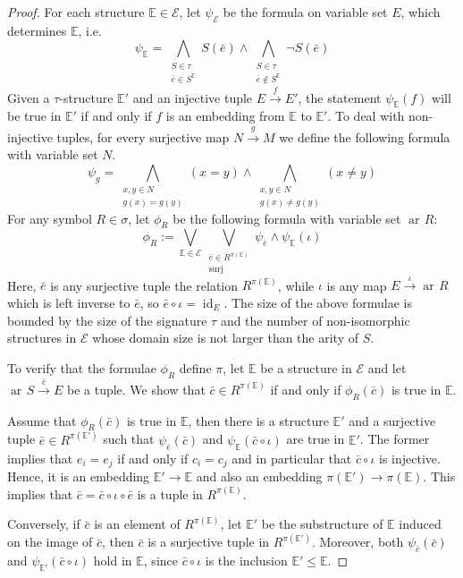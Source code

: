 \documentclass[preprint,12pt]{elsarticle}
\newcommand{\cat}[1]{\mathcal{#1}}
\newcommand{\str}[1]{\mathbb{#1}}
\DeclareMathOperator{\id}{id}
\DeclareMathOperator{\ar}{ar\!}
\begin{document}
\begin{proof}
    For each structure $\str E\in\cat E$, let $\psi_{\cat E}$ be the formula on variable set $E$, which determines $\str E$, i.e.
    $$
    \psi_{\str E} = 
    \bigwedge_{\substack{S\in\tau\\ \bar{e}\in S^{\str E}}} S(\bar{e}) \wedge
    \bigwedge_{\substack{S\in\tau\\ \bar{e}\notin S^{\str E}}} \neg S(\bar{e})
    $$
    Given a $\tau$-structure $\str E'$ and an injective tuple $E\xrightarrow{f}E'$, the statement $\psi_{\str E}(f)$ will be true in $\str E'$ if and only if $f$ is an embedding from $\str E$ to $\str E'$. To deal with non-injective tuples, for every surjective map $N\xrightarrow{g}M$ we define the following formula with variable set $N$.
    $$
    \psi_g =
    \bigwedge_{\substack{x,y\in N\\ g(x)= g(y)}} (x = y) \wedge
    \bigwedge_{\substack{x,y\in N\\ g(x)\neq g(y)}} (x \neq y)
    $$
    For any symbol $R\in\sigma$, let $\phi_R$ be the following formula with variable set $\ar R$:
    $$
    \phi_R :=
    \bigvee_{\str E\in\cat E}
    \bigvee_{\substack{\bar{e}\in R^{\pi(\str E)} \\ \text{surj}}}
    \psi_{\bar{e}}\wedge \psi_{\str E}(\iota)
    $$
    Here, $\bar{e}$ is any surjective tuple the relation $R^{\pi(\str E)}$, while $\iota$ is any map $E\xrightarrow{\iota}\ar R$ which is left inverse to $\bar{e}$, so $\bar{e}\circ\iota=\id_{E}$. The size of the above formulae is bounded by the size of the signature $\tau$ and the number of non-isomorphic structures in $\cat E$ whose domain size is not larger than the arity of $S$.
    
    To verify that the formulae $\phi_R$ define $\pi$, let $\str E$ be a structure in $\cat E$ and let $\ar S\xrightarrow{\bar{c}} E$ be a tuple. We show that $\bar{c}\in R^{\pi(\str E)}$ if and only if $\phi_R(\bar{c})$ is true in $\str E$.
    
    Assume that $\phi_R(\bar{c})$ is true in $\str E$, then there is a structure $\str E'$ and a surjective tuple $\bar{e}\in R^{\pi(\str E')}$ such that $\psi_{\bar{e}}(\bar{c})$ and $\psi_{\str E}({\bar{c}\circ\iota})$ are true in $\str E'$. The former implies that $e_i=e_j$ if and only if $c_i=c_j$ and in particular that $\bar{c}\circ\iota$ is injective. Hence, it is an embedding $\str E'\xrightarrow{}\str E$ and also an embedding $\pi(\str E')\xrightarrow{}\pi(\str E)$. This implies that $\bar{c}=\bar{c}\circ\iota\circ\bar{e}$ is a tuple in $R^{\pi(\str E)}$.

    Conversely, if $\bar{c}$ is an element of $R^{\pi(\str E)}$, let $\str E'$ be the substructure of $\str E$ induced on the image of $\bar{c}$, then $\bar{c}$ is a surjective tuple in $R^{\pi(\str E')}$. Moreover, both $\psi_{\bar{c}}(\bar{c})$ and $\psi_{\str E'}(\bar{c}\circ\iota)$ hold in $\str E$, since $\bar{c}\circ\iota$ is the inclusion $\str E'\leq \str E$.
\end{proof}
\end{document}
